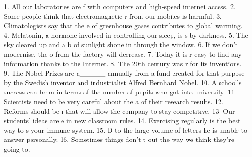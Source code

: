 1. All our laboratories are f\underline{\hspace{2cm}} with computers and high-speed internet access.
2. Some people think that electromagnetic r\underline{\hspace{2cm}} from our mobiles is harmful. 3.
Climatologists say that the e\underline{\hspace{2cm}} of greenhouse gases contributes to global
warming. 4. Melatonin, a hormone involved in controlling our sleep, is s\underline{\hspace{2cm}} by
darkness. 5. The sky cleared up and a b\underline{\hspace{2cm}} of sunlight shone in through the
window. 6. If we don’t modernise, the o\underline{\hspace{2cm}} from the factory will decrease. 7.
Today it is r\underline{\hspace{2cm}} easy to find any information thanks to the Internet. 8. The
20th century was r\underline{\hspace{2cm}} for its inventions. 9. The Nobel Prizes are a\_\_\_\_\_
annually from a fund created for that purpose by the Swedish inventor and industrialist
Alfred Bernhard Nobel. 10. A school’s success can be m\underline{\hspace{2cm}} in terms of the number
of pupils who got into university. 11. Scientists need to be very careful about the
a\underline{\hspace{2cm}} of their research results. 12. Reforms should be i\underline{\hspace{2cm}} that will
allow the company to stay competitive. 13. Our students’ ideas are e\underline{\hspace{2cm}} in
new classroom rules. 14. Exercising regularly is the best way to s\underline{\hspace{2cm}} your
immune system. 15. D\underline{\hspace{2cm}} to the large volume of letters he is unable to answer
personally. 16. Sometimes things don't t\underline{\hspace{2cm}} out the way we think they're going
to.

